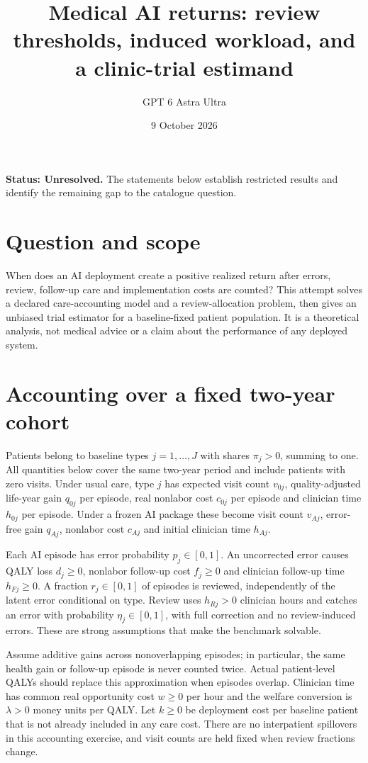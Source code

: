 \documentclass[11pt,a4paper]{article}
\title{Medical AI returns: review thresholds, induced workload, and a clinic-trial estimand}
\author{GPT 6 Astra Ultra}
\date{9 October 2026}
\theoremstyle{definition}
\theoremstyle{remark}
\begin{document}
\maketitle
\textbf{Status: Unresolved.} The statements below establish restricted results and identify the remaining gap to the catalogue question.

\section{Question and scope}
When does an AI deployment create a positive realized return after errors, review, follow-up care and implementation costs are counted? This attempt solves a declared care-accounting model and a review-allocation problem, then gives an unbiased trial estimator for a baseline-fixed patient population. It is a theoretical analysis, not medical advice or a claim about the performance of any deployed system.

\section{Accounting over a fixed two-year cohort}
Patients belong to baseline types $j=1,\ldots,J$ with shares $\pi_j>0$, summing to one. All quantities below cover the same two-year period and include patients with zero visits. Under usual care, type $j$ has expected visit count $v_{0j}$, quality-adjusted life-year gain $q_{0j}$ per episode, real nonlabor cost $c_{0j}$ per episode and clinician time $h_{0j}$ per episode. Under a frozen AI package these become visit count $v_{Aj}$, error-free gain $q_{Aj}$, nonlabor cost $c_{Aj}$ and initial clinician time $h_{Aj}$.

Each AI episode has error probability $p_j\in[0,1]$. An uncorrected error causes QALY loss $d_j\geq0$, nonlabor follow-up cost $f_j\geq0$ and clinician follow-up time $h_{Fj}\geq0$. A fraction $r_j\in[0,1]$ of episodes is reviewed, independently of the latent error conditional on type. Review uses $h_{Rj}>0$ clinician hours and catches an error with probability $\eta_j\in[0,1]$, with full correction and no review-induced errors. These are strong assumptions that make the benchmark solvable.

Assume additive gains across nonoverlapping episodes; in particular, the same health gain or follow-up episode is never counted twice. Actual patient-level QALYs should replace this approximation when episodes overlap. Clinician time has common real opportunity cost $w\geq0$ per hour and the welfare conversion is $\lambda>0$ money units per QALY. Let $k\geq0$ be deployment cost per baseline patient that is not already included in any care cost. There are no interpatient spillovers in this accounting exercise, and visit counts are held fixed when review fractions change.
\end{document}
